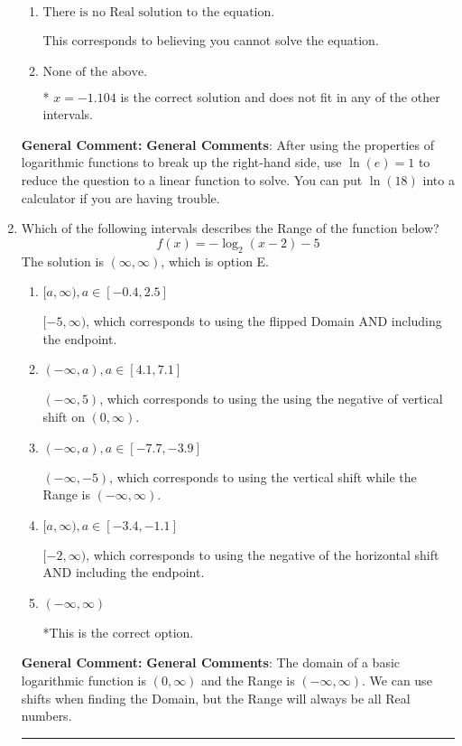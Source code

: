 \documentclass{extbook}[14pt]
\newcommand{\litem}[1]{\item #1

\rule{\textwidth}{0.4pt}}
\begin{document}
\begin{enumerate}
{\begin{enumerate}[label=\Alph*.]
$x = -0.249$, which corresponds to treating any root as a square root.
\item \( \text{There is no Real solution to the equation.} \)

This corresponds to believing you cannot solve the equation.
\item \( \text{None of the above.} \)

* $x = -1.104$ is the correct solution and does not fit in any of the other intervals.
\end{enumerate}

\textbf{General Comment:} \textbf{General Comments}: After using the properties of logarithmic functions to break up the right-hand side, use $\ln(e) = 1$ to reduce the question to a linear function to solve. You can put $\ln(18)$ into a calculator if you are having trouble.
}
\litem{
Which of the following intervals describes the Range of the function below?
\[ f(x) = -\log_2{(x-2)}-5 \]The solution is \( (\infty, \infty) \), which is option E.\begin{enumerate}[label=\Alph*.]
\item \( [a, \infty), a \in [-0.4, 2.5] \)

$[-5, \infty)$, which corresponds to using the flipped Domain AND including the endpoint.
\item \( (-\infty, a), a \in [4.1, 7.1] \)

$(-\infty, 5)$, which corresponds to using the using the negative of vertical shift on $(0, \infty)$.
\item \( (-\infty, a), a \in [-7.7, -3.9] \)

$(-\infty, -5)$, which corresponds to using the vertical shift while the Range is $(-\infty, \infty)$.
\item \( [a, \infty), a \in [-3.4, -1.1] \)

$[-2, \infty)$, which corresponds to using the negative of the horizontal shift AND including the endpoint.
\item \( (-\infty, \infty) \)

*This is the correct option.
\end{enumerate}

\textbf{General Comment:} \textbf{General Comments}: The domain of a basic logarithmic function is $(0, \infty)$ and the Range is $(-\infty, \infty)$. We can use shifts when finding the Domain, but the Range will always be all Real numbers.
}
\end{enumerate}
\end{document}
